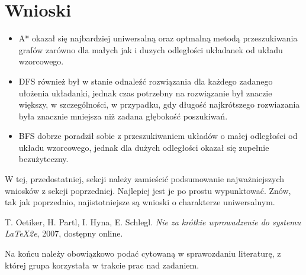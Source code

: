 \documentclass{classrep}
\begin{document}
    \section{Wnioski}
    {\color{blue}
     \begin{itemize}
        \item A* okazał się najbardziej uniwersalną oraz optmalną metodą przeszukiwania grafów zarówno dla małych jak i duzych odległości układanek od układu wzorcowego.
         \item DFS również był w stanie odnaleźć rozwiązania dla każdego zadanego ułożenia układanki, jednak czas potrzebny na rozwiązanie był znaczie większy,
            w szczególności, w przypadku, gdy długość najkrótszego rozwiazania była znacznie mniejsza niż zadana głębokość poszukiwań.
         \item BFS dobrze poradził sobie z przeszukiwaniem układów o małej odległości od układu wzorcowego, jednak dla dużych odległości okazał się zupełnie bezużyteczny.
     \end{itemize}


    W tej, przedostatniej, sekcji należy zamieścić podsumowanie najważniejszych
    wniosków z sekcji poprzedniej. Najlepiej jest je po prostu wypunktować. Znów,
        tak jak poprzednio, najistotniejsze są wnioski o charakterze uniwersalnym.
    }

    \begin{thebibliography}{0}
         T. Oetiker, H. Partl, I. Hyna, E. Schlegl.
        \textsl{Nie za krótkie wprowadzenie do systemu \LaTeX2e}, 2007, dost\k epny
        online.
    \end{thebibliography}

    {\color{blue}
    Na końcu należy obowiązkowo podać cytowaną w sprawozdaniu literaturę, z której
    grupa korzystała w trakcie prac nad zadaniem.}
\end{document}
